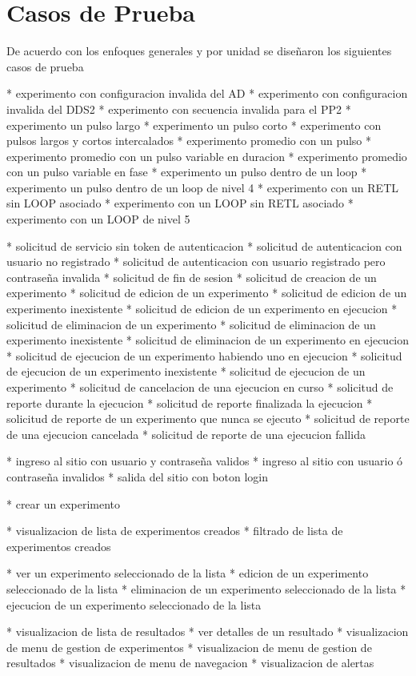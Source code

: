 \section{Casos de Prueba}

De acuerdo con los enfoques generales y por unidad se diseñaron los siguientes casos de prueba

* experimento con configuracion invalida del AD
* experimento con configuracion invalida del DDS2
* experimento con secuencia invalida para el PP2
* experimento un pulso largo
* experimento un pulso corto
* experimento con pulsos largos y cortos intercalados
* experimento promedio con un pulso
* experimento promedio con un pulso variable en duracion
* experimento promedio con un pulso variable en fase
* experimento un pulso dentro de un loop
* experimento un pulso dentro de un loop de nivel 4
* experimento con un RETL sin LOOP asociado
* experimento con un LOOP sin RETL asociado
* experimento con un LOOP de nivel 5

* solicitud de servicio sin token de autenticacion
* solicitud de autenticacion con usuario no registrado
* solicitud de autenticacion con usuario registrado pero contraseña invalida
* solicitud de fin de sesion
* solicitud de creacion de un experimento
* solicitud de edicion de un experimento
* solicitud de edicion de un experimento inexistente
* solicitud de edicion de un experimento en ejecucion
* solicitud de eliminacion de un experimento
* solicitud de eliminacion de un experimento inexistente
* solicitud de eliminacion de un experimento en ejecucion
* solicitud de ejecucion de un experimento habiendo uno en ejecucion
* solicitud de ejecucion de un experimento inexistente
* solicitud de ejecucion de un experimento
* solicitud de cancelacion de una ejecucion en curso
* solicitud de reporte durante la ejecucion
* solicitud de reporte finalizada la ejecucion
* solicitud de reporte de un experimento que nunca se ejecuto
* solicitud de reporte de una ejecucion cancelada
* solicitud de reporte de una ejecucion fallida


* ingreso al sitio con usuario y contraseña validos
* ingreso al sitio con usuario ó contraseña invalidos
* salida del sitio con boton login

* crear un experimento

* visualizacion de lista de experimentos creados
* filtrado de lista de experimentos creados

* ver un experimento seleccionado de la lista
* edicion de un experimento seleccionado de la lista
* eliminacion de un experimento seleccionado de la lista
* ejecucion de un experimento seleccionado de la lista



* visualizacion de lista de resultados
* ver detalles de un resultado
* visualizacion de menu de gestion de experimentos
* visualizacion de menu de gestion de resultados
* visualizacion de menu de navegacion
* visualizacion de alertas

\newpage
